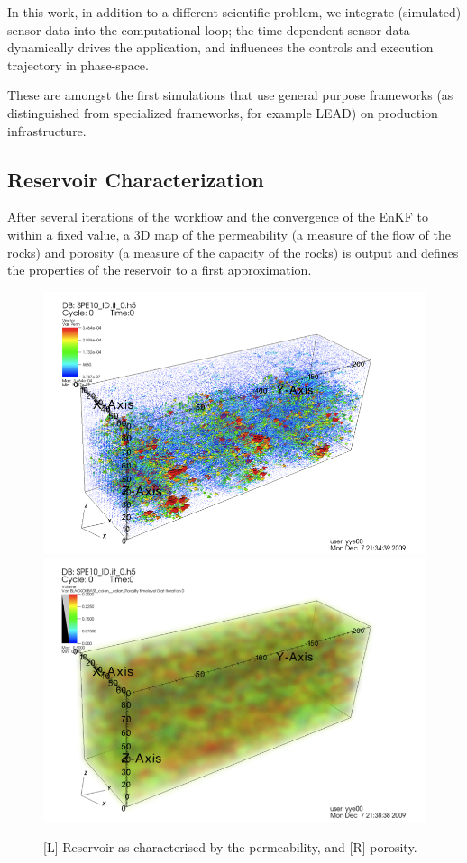 \documentclass{rspublic}
\begin{document}
In this work, in addition to a different scientific problem, we
integrate (simulated) sensor data into the computational loop; the
time-dependent sensor-data dynamically drives the application, and
influences the controls and execution trajectory in phase-space.

These are amongst the first simulations
that use general purpose frameworks (as distinguished from specialized
frameworks, for example LEAD) on production infrastructure.

\subsection{Reservoir Characterization}

After several iterations of the workflow and the convergence of the
EnKF to within a fixed value, a 3D map of the permeability (a measure of the flow
of the rocks) and porosity (a measure of the capacity of the rocks) is 
output and defines the properties of the reservoir to a first
approximation. \begin{figure}
\begin{center}
\includegraphics[scale=0.45]{figures/permeability.png}
\includegraphics[scale=0.45]{figures/porosity.png}
\end{center}
\caption[Simulation Output]{[L] Reservoir as characterised by the
  permeability, and [R] porosity. }
\label{}
\end{figure}
\end{document}
